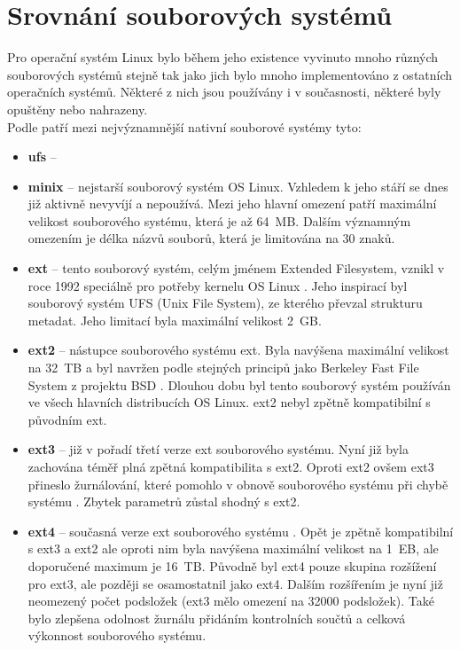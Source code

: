 \section{Srovnání souborových systémů}
Pro operační systém Linux bylo během jeho existence vyvinuto mnoho různých souborových systémů stejně tak jako jich bylo mnoho implementováno z ostatních operačních systémů. Některé z nich jsou používány i v současnosti, některé byly opuštěny nebo nahrazeny.\\
Podle \cite{tldp-filesystem} patří mezi nejvýznamnější nativní souborové systémy tyto:
\begin{itemize}
    \item \textbf{ufs} -- 
    \item \textbf{minix} -- nejstarší souborový systém OS Linux. Vzhledem k jeho stáří se dnes již aktivně nevyvíjí a nepoužívá. Mezi jeho hlavní omezení patří maximální velikost souborového systému, která je až 64~MB. Dalším významným omezením je délka názvů souborů, která je limitována na 30 znaků.
    \item \textbf{ext} -- tento souborový systém, celým jménem Extended Filesystem, vznikl v roce 1992 speciálně pro potřeby kernelu OS Linux \cite{linmag-ext}. Jeho inspirací byl souborový systém UFS (Unix File System), ze kterého převzal strukturu metadat. Jeho limitací byla maximální velikost 2~GB.
    \item \textbf{ext2} -- nástupce souborového systému ext. Byla navýšena maximální velikost na 32~TB a byl navržen podle stejných principů jako Berkeley Fast File System z projektu BSD \cite{nongnu-ext2}. Dlouhou dobu byl tento souborový systém používán ve všech hlavních distribucích OS Linux. ext2 nebyl zpětně kompatibilní s původním ext.
    \item \textbf{ext3} -- již v pořadí třetí verze ext souborového systému. Nyní již byla zachována téměř plná zpětná kompatibilita s ext2. Oproti ext2 ovšem ext3 přineslo žurnálování, které pomohlo v obnově souborového systému při chybě systému \cite{paper-ext3}. Zbytek parametrů zůstal shodný s ext2.
    \item \textbf{ext4} -- současná verze ext souborového systému \cite{paper-ext4}. Opět je zpětně kompatibilní s ext3 a ext2 ale oproti nim byla navýšena maximální velikost na 1~EB, ale doporučené maximum je 16~TB. Původně byl ext4 pouze skupina rozšížení pro ext3, ale později se osamostatnil jako ext4. Dalším rozšířením je nyní již neomezený počet podsložek (ext3 mělo omezení na 32000 podsložek). Také bylo zlepšena odolnost žurnálu přidáním kontrolních součtů a celková výkonnost souborového systému.

\end{itemize}

